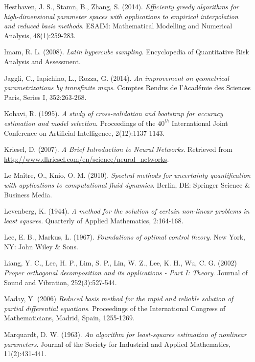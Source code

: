 \documentclass[longtitle]{elsarticle}
\numberwithin{equation}{section}
\theoremstyle{theorem}
\theoremstyle{definition}
\theoremstyle{remark}
\theoremstyle{proposition}
\numberwithin{figure}{section}
\begin{document}
\begin{thebibliography}{50}
		Hesthaven, J. S., Stamn, B., Zhang, S. (2014). \emph{Efficienty greedy algorithms for high-dimensional parameter spaces with applications to empirical interpolation and reduced basis methods}. ESAIM: Mathematical Modelling and Numerical Analysis, 48(1):259-283.
		
		Imam, R. L. (2008). \emph{Latin hypercube sampling}. Encyclopedia of Quantitative Risk Analysis and Assessment.
		
		Jaggli, C., Iapichino, L., Rozza, G. (2014). \emph{An improvement on geometrical parametrizations by transfinite maps}. Comptes Rendus de l'Acad\'emie des Sciences Paris, Series I, 352:263-268. 
				
		Kohavi, R. (1995). \emph{A study of cross-validation and bootstrap for accuracy estimation and model selection}. Proceedings of the $40^{th}$ International Joint Conference on Artificial Intelligence, 2(12):1137-1143.
		
		Kriesel, D. (2007). \emph{A Brief Introduction to Neural Networks}. Retrieved from \url{http://www.dkriesel.com/en/science/neural_networks}.
		
		Le Ma\^{i}tre, O., Knio, O. M. (2010). \emph{Spectral methods for uncertainty quantification with applications to computational fluid dynamics}. Berlin, DE: Springer Science \& Business Media.
		
		Levenberg, K. (1944). \emph{A method for the solution of certain non-linear problems in least squares}. Quarterly of Applied Mathematics, 2:164-168.

		Lee, E. B., Markus, L. (1967). \emph{Foundations of optimal control theory}. New York, NY: John Wiley \& Sons.
		
		Liang, Y. C., Lee, H. P., Lim, S. P., Lin, W. Z., Lee, K. H., Wu, C. G. (2002) \emph{Proper orthogonal decomposition and its applications - Part I: Theory}. Journal of Sound and Vibration, 252(3):527-544.

		Maday, Y. (2006) \emph{Reduced basis method for the rapid and reliable solution of partial differential equations}. Proceedings of the International Congress of Mathematicians, Madrid, Spain, 1255-1269.
		
		Marquardt, D. W. (1963). \emph{An algorithm for least-squares estimation of nonlinear parameters}. Journal of the Society for Industrial and Applied Mathematics, 11(2):431-441.
		

\end{thebibliography}
\end{document}

